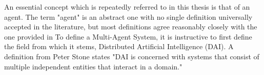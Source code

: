 
An essential concept which is repeatedly referred to in this thesis is that of an agent. The term "agent" is an abstract one with no single definition universally accepted in the literature, but most definitions agree reasonably closely with the one provided in 
To define a Multi-Agent System, it is instructive to first define the field from which it stems, Distributed Artificial Intelligence (DAI). A definition from Peter Stone states "DAI is concerned with systems that consist of multiple independent entities that interact in a domain."\cite{Stone2000MultiagentPerspective}
